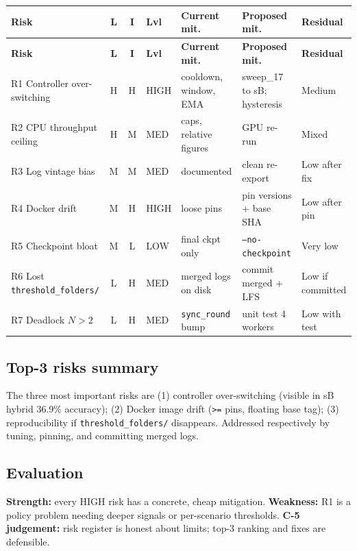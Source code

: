 \documentclass[11pt,a4paper]{article}
\begin{document}
{\scriptsize
\begin{longtable}{@{}L c c L L L L@{}}
  \toprule
  \textbf{Risk} & \textbf{L} & \textbf{I} & \textbf{Lvl} & \textbf{Current mit.} & \textbf{Proposed mit.} & \textbf{Residual} \\
  \midrule
  \endfirsthead
  \toprule
  \textbf{Risk} & \textbf{L} & \textbf{I} & \textbf{Lvl} & \textbf{Current mit.} & \textbf{Proposed mit.} & \textbf{Residual} \\
  \midrule
  \endhead
  \bottomrule
  \endfoot
  R1 Controller over-switching & H & H & HIGH & cooldown, window, EMA & sweep\_17 to sB; hysteresis & Medium \\
  R2 CPU throughput ceiling & H & M & MED & caps, relative figures & GPU re-run & Mixed \\
  R3 Log vintage bias & M & M & MED & documented & clean re-export & Low after fix \\
  R4 Docker drift & M & H & HIGH & loose pins & pin versions + base SHA & Low after pin \\
  R5 Checkpoint bloat & M & L & LOW & final ckpt only & \texttt{--no-checkpoint} & Very low \\
  R6 Lost \texttt{threshold\_folders/} & L & H & MED & merged logs on disk & commit merged + LFS & Low if committed \\
  R7 Deadlock $N>2$ & L & H & MED & \texttt{sync\_round} bump & unit test 4 workers & Low with test \\
\end{longtable}
}

\subsection{Top-3 risks summary}

The three most important risks are (1) controller over-switching (visible in sB hybrid 36.9\% accuracy); (2) Docker image drift (\texttt{>=} pins, floating base tag); (3) reproducibility if \texttt{threshold\_folders/} disappears. Addressed respectively by tuning, pinning, and committing merged logs.

\subsection{Evaluation}
\textbf{Strength:} every HIGH risk has a concrete, cheap mitigation. \textbf{Weakness:} R1 is a policy problem needing deeper signals or per-scenario thresholds. \textbf{C-5 judgement:} risk register is honest about limits; top-3 ranking and fixes are defensible.
\end{document}
